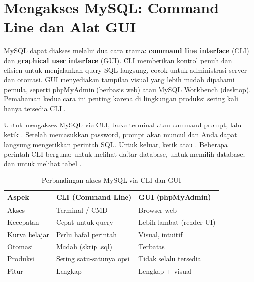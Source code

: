 \section{Mengakses MySQL: Command Line dan Alat GUI}

MySQL dapat diakses melalui dua cara utama: \textbf{command line interface} (CLI) dan \textbf{graphical user interface} (GUI). CLI memberikan kontrol penuh dan efisien untuk menjalankan query SQL langsung, cocok untuk administrasi server dan otomasi. GUI menyediakan tampilan visual yang lebih mudah dipahami pemula, seperti phpMyAdmin (berbasis web) atau MySQL Workbench (desktop). Pemahaman kedua cara ini penting karena di lingkungan produksi sering kali hanya tersedia CLI \cite{mysqlDocs}.

Untuk mengakses MySQL via CLI, buka terminal atau command prompt, lalu ketik . Setelah memasukkan password, prompt  akan muncul dan Anda dapat langsung mengetikkan perintah SQL. Untuk keluar, ketik  atau \code{\\q}. Beberapa perintah CLI berguna:  untuk melihat daftar database,  untuk memilih database, dan  untuk melihat tabel \cite{mysqlGettingStarted}.

\begin{table}[ht]
\centering
\begin{tabular}{|P{3cm}|P{5cm}|P{5cm}|}
\hline
\textbf{Aspek} & \textbf{CLI (Command Line)} & \textbf{GUI (phpMyAdmin)} \\
\hline
Akses & Terminal / CMD & Browser web \\
\hline
Kecepatan & Cepat untuk query & Lebih lambat (render UI) \\
\hline
Kurva belajar & Perlu hafal perintah & Visual, intuitif \\
\hline
Otomasi & Mudah (skrip .sql) & Terbatas \\
\hline
Produksi & Sering satu-satunya opsi & Tidak selalu tersedia \\
\hline
Fitur & Lengkap & Lengkap + visual \\
\hline
\end{tabular}
\caption{Perbandingan akses MySQL via CLI dan GUI}
\end{table}


